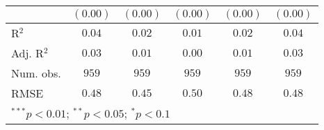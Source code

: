 \begin{table}
\begin{center}
\begin{tabular}{l c c c c c}
              & $(0.00)$      & $(0.00)$      & $(0.00)$    & $(0.00)$   & $(0.00)$      \\
\midrule
R$^2$         & $0.04$        & $0.02$        & $0.01$      & $0.02$     & $0.04$        \\
Adj. R$^2$    & $0.03$        & $0.01$        & $0.00$      & $0.01$     & $0.03$        \\
Num. obs.     & $959$         & $959$         & $959$       & $959$      & $959$         \\
RMSE          & $0.48$        & $0.45$        & $0.50$      & $0.48$     & $0.48$        \\
\bottomrule
\multicolumn{6}{l}{\scriptsize{$^{***}p<0.01$; $^{**}p<0.05$; $^{*}p<0.1$}}
\end{tabular}
\label{tab_risk}
\end{center}
\end{table}
